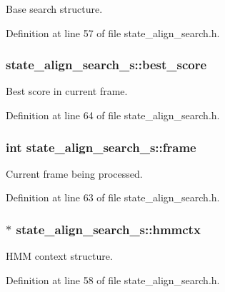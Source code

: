 \-Base search structure. 



\-Definition at line 57 of file state\-\_\-align\-\_\-search.\-h.

\subsubsection[{best\-\_\-score}]{ {\bf state\-\_\-align\-\_\-search\-\_\-s\-::best\-\_\-score}}\label{structstate__align__search__s_a1810f343c6ae382f5ed0a5eb02d33037}


\-Best score in current frame. 



\-Definition at line 64 of file state\-\_\-align\-\_\-search.\-h.

\subsubsection[{frame}]{\setlength{\rightskip}{0pt plus 5cm}int {\bf state\-\_\-align\-\_\-search\-\_\-s\-::frame}}\label{structstate__align__search__s_aa520abfdb4d0bca2b769f281839637a9}


\-Current frame being processed. 



\-Definition at line 63 of file state\-\_\-align\-\_\-search.\-h.

\subsubsection[{hmmctx}]{$\ast$ {\bf state\-\_\-align\-\_\-search\-\_\-s\-::hmmctx}}\label{structstate__align__search__s_a683e76dbcc87cde89ca5d45b4b91c1e9}


\-H\-M\-M context structure. 



\-Definition at line 58 of file state\-\_\-align\-\_\-search.\-h.

